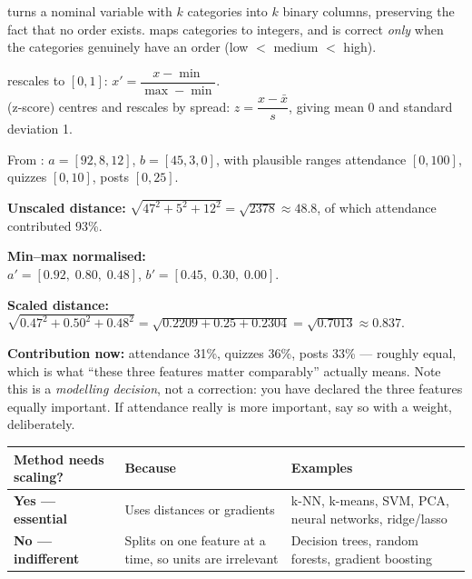 \begin{definitionbox}
 turns a nominal variable with $k$ categories into $k$
binary columns, preserving the fact that no order exists.
 maps categories to integers, and is correct \emph{only}
when the categories genuinely have an order (low $<$ medium $<$ high).
\end{definitionbox}

\begin{definitionbox}
 rescales to $[0,1]$:
$x' = \dfrac{x - \min}{\max - \min}$.\\[3pt]
 (z-score) centres and rescales by spread:
$z = \dfrac{x - \bar{x}}{s}$, giving mean 0 and standard deviation 1.
\end{definitionbox}

\begin{worked}
From : $a = [92, 8, 12]$, $b = [45, 3, 0]$, with plausible ranges
attendance $[0,100]$, quizzes $[0,10]$, posts $[0,25]$.

\smallskip
\textbf{Unscaled distance:} $\sqrt{47^2 + 5^2 + 12^2} = \sqrt{2378} \approx 48.8$,
of which attendance contributed 93\%.

\textbf{Min--max normalised:}\\
$a' = [0.92,\; 0.80,\; 0.48]$, \quad $b' = [0.45,\; 0.30,\; 0.00]$.

\textbf{Scaled distance:}
$\sqrt{0.47^2 + 0.50^2 + 0.48^2} = \sqrt{0.2209 + 0.25 + 0.2304}
= \sqrt{0.7013} \approx 0.837$.

\smallskip
\textbf{Contribution now:} attendance 31\%, quizzes 36\%, posts 33\% --- roughly
equal, which is what ``these three features matter comparably'' actually means.
Note this is a \emph{modelling decision}, not a correction: you have declared the
three features equally important. If attendance really is more important, say so
with a weight, deliberately.
\end{worked}

\begin{longtable}{@{}L{4.4cm}L{4.6cm}L{5.5cm}@{}}
\toprule
{}
\textbf{Method needs scaling?} & \textbf{Because} & \textbf{Examples} \\
\midrule
\endhead
\textbf{Yes --- essential} & Uses distances or gradients & k-NN, k-means, SVM, PCA, neural networks, ridge/lasso \\
\textbf{No --- indifferent} & Splits on one feature at a time, so units are irrelevant & Decision trees, random forests, gradient boosting \\
\bottomrule
\end{longtable}

